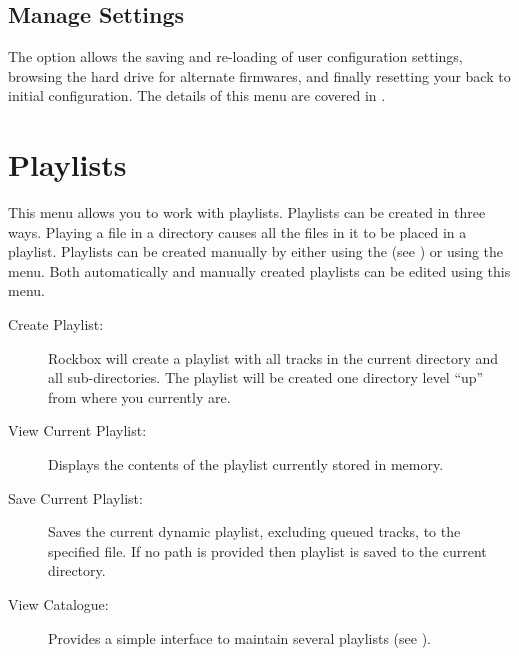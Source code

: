 
\subsection{Manage Settings}
The  option allows the saving and re-loading of user 
configuration settings, browsing the hard drive for alternate firmwares, and finally
resetting your \dap{} back to initial configuration.
%
The details of this menu are covered in
.



\section{\label{ref:playlistoptions}Playlists}
  This menu allows you to work with playlists. Playlists can be created in 
  three ways. Playing a file in a directory causes all the files in it
  to be placed in a playlist. Playlists can be created manually by
  either using the   (see ) or using
  the  menu. Both automatically and manually created
  playlists can be edited using this menu.

\begin{description}
\item[Create Playlist:]
  Rockbox will create a playlist with all tracks in the current directory 
and all sub-directories. The playlist will be created one directory level ``up'' 
from where you currently are.
  
\item[View Current Playlist:]
  Displays the contents of the playlist currently stored in memory.
  
\item[Save Current Playlist:]
  Saves the current dynamic playlist, excluding queued tracks, to the 
specified file. If no path is provided then playlist is saved to the current 
directory.

\item[View Catalogue:]
  Provides a simple interface to maintain
  several playlists (see ).
\end{description}

